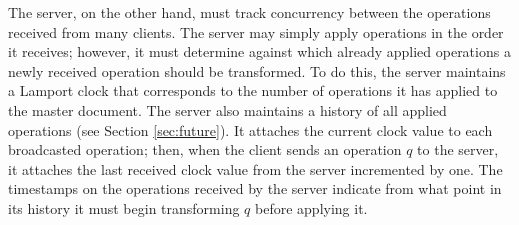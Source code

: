 \documentclass[letterpaper,11pt,twocolumn]{article}
\newcommand{\code}[1]{\texttt{\small #1}}
\begin{document}
%
%
%
%
%


The server, on the other hand, must track concurrency between the operations received from many clients.  The server may simply apply operations in the order it receives; however, it must determine against which already applied operations a newly received operation should be transformed.  To do this, the server maintains a Lamport clock that corresponds to the number of operations it has applied to the master document.  The server also maintains a history of all applied operations (see Section \ref{sec:future}).  It attaches the current clock value to each broadcasted operation; then, when the client sends an operation $q$ to the server, it attaches the last received clock value from the server incremented by one.  The timestamps on the operations received by the server indicate from what point in its history it must begin transforming $q$ before applying it.
\end{document}
